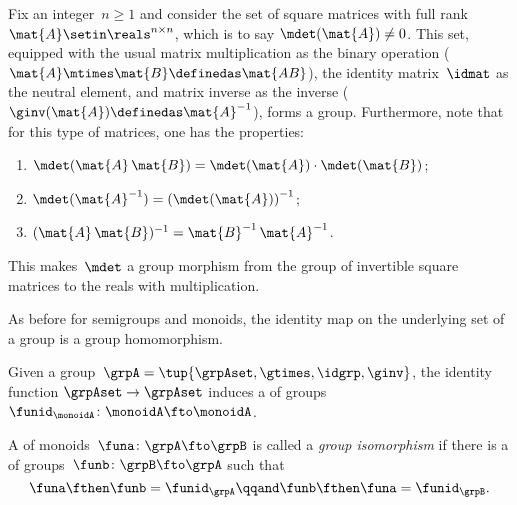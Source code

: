 \begin{example}
    \label{exa:square-full}
    Fix an integer~$n\geq1 $ and consider the set of square matrices with full rank~$\mat{A} \setin \reals^{n\times n}$, which is to say $\mdet(\mat{A}) \neq 0$.
    This set, equipped with the usual matrix multiplication as the binary operation ($\mat{A}\mtimes \mat{B}\definedas \mat{AB}$), the identity matrix~$\idmat$ as the neutral element, and matrix inverse as the inverse ($\ginv(\mat{A})\definedas \mat{A}^{-1}$), forms a group.
    Furthermore, note that for this type of matrices, one has the properties:
    \begin{enumerate}
        \item $\mdet(\mat{A} \, \mat{B}) = \mdet(\mat{A}) \cdot  \mdet(\mat{B})$;
        \item $\mdet(\mat{A}^{-1}) = \left( \mdet(\mat{A}) \right) ^ {-1}$;
        \item $(\mat{A}\,\mat{B})^{-1} = {\mat{B}^{-1} \, \mat{A}^{-1}}$.
    \end{enumerate}
    This makes~$\mdet$ a group morphism from the group of invertible square matrices to the reals with multiplication.
\end{example}

As before for semigroups and monoids, the identity map on the underlying set of a group is a group homomorphism.

\begin{ctdefinition}
    \label{def:identity-grp-mor}
    Given a group~$\grpA =  \tup{\grpAset, \gtimes, \idgrp, \ginv}$, the identity function $\grpAset \to \grpAset$ induces a \whomo of groups~$\funid_\monoidA\colon \monoidA \fto \monoidA$.
\end{ctdefinition}

\begin{ctdefinition}
    \label{def:grp-iso}
    A \whomo of monoids~$\funa\colon \grpA \fto \grpB$ is called a \emph{group isomorphism} if there is a \whomo of groups~$\funb\colon \grpB \fto \grpA$ such that
    \begin{equation*}
        \funa \fthen \funb = \funid_\grpA \qqand \funb \fthen \funa = \funid_\grpB.
    \end{equation*}
\end{ctdefinition}


